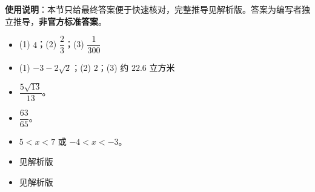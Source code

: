
\begin{gknotice}
\textbf{使用说明}：本节只给最终答案便于快速核对，完整推导见解析版。答案为编写者独立推导，\textbf{非官方标准答案}。
\end{gknotice}

\begin{itemize}[leftmargin=2.6em]
  \item[\textbf{1.}] (1) $4$；(2) $\dfrac23$；(3) $\dfrac1{300}$
  \item[\textbf{2.}] (1) $-3-2\sqrt2$；(2) $2$；(3) 约 $22.6$ 立方米
  \item[\textbf{3.}] $\dfrac{5\sqrt{13}}{13}$。
  \item[\textbf{4.}] $\dfrac{63}{65}$。
  \item[\textbf{5.}] $5<x<7$ 或 $-4<x<-3$。
  \item[\textbf{6.}] 见解析版
  \item[\textbf{7.}] 见解析版
\end{itemize}
